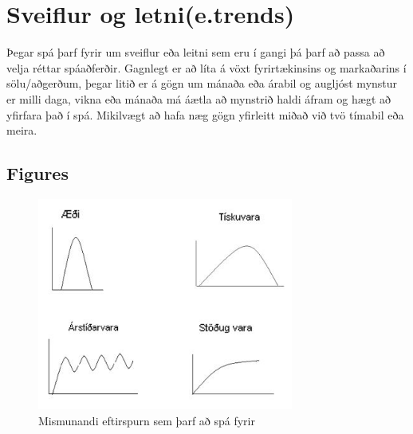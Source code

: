 %
%
%

\section {Sveiflur og letni(e.trends)}
 
Þegar spá þarf fyrir um sveiflur eða leitni sem eru í gangi þá þarf að passa að velja réttar spáaðferðir. Gagnlegt er að líta á vöxt fyrirtækinsins og markaðarins í sölu/aðgerðum, þegar litið er á gögn um mánaða eða árabil og augljóst mynstur er milli daga, vikna eða mánaða má áætla að mynstrið haldi áfram og hægt að yfirfara það í spá. Mikilvægt að hafa næg gögn yfirleitt miðað við tvö tímabil eða meira. \cite{What-Is-Trend-Forecasting}

\subsection{Figures}

\begin{figure}[htb]
\begin{center}

\includegraphics[width=0.75\textwidth]{tegundirspar}
\caption{Mismunandi eftirspurn sem þarf að spá fyrir}
\label{fig:figure1}
\end{center}
\end{figure}


